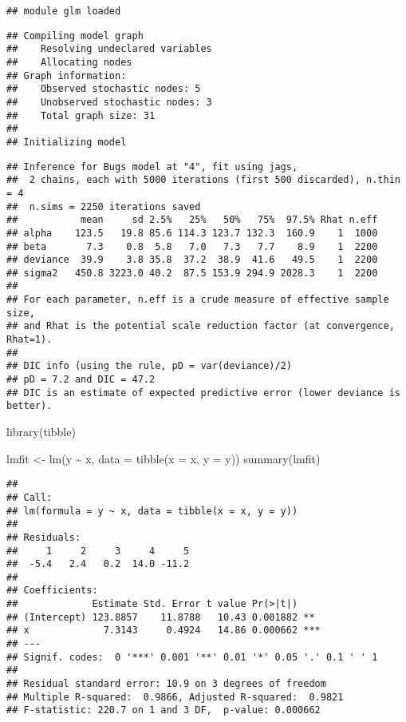 \documentclass[
  oneside]{book}
\newenvironment{Shaded}{\begin{snugshade}}{\end{snugshade}}
\newcommand{\AttributeTok}[1]{\textcolor[rgb]{0.77,0.63,0.00}{#1}}
\newcommand{\FunctionTok}[1]{\textcolor[rgb]{0.00,0.00,0.00}{#1}}
\newcommand{\NormalTok}[1]{#1}
\newcommand{\OtherTok}[1]{\textcolor[rgb]{0.56,0.35,0.01}{#1}}
\newcommand{\SpecialCharTok}[1]{\textcolor[rgb]{0.00,0.00,0.00}{#1}}
\begin{document}
\begin{verbatim}
## module glm loaded
\end{verbatim}

\begin{verbatim}
## Compiling model graph
##    Resolving undeclared variables
##    Allocating nodes
## Graph information:
##    Observed stochastic nodes: 5
##    Unobserved stochastic nodes: 3
##    Total graph size: 31
## 
## Initializing model
\end{verbatim}

\begin{Shaded}
\end{Shaded}

\begin{verbatim}
## Inference for Bugs model at "4", fit using jags,
##  2 chains, each with 5000 iterations (first 500 discarded), n.thin = 4
##  n.sims = 2250 iterations saved
##           mean     sd 2.5%   25%   50%   75%  97.5% Rhat n.eff
## alpha    123.5   19.8 85.6 114.3 123.7 132.3  160.9    1  1000
## beta       7.3    0.8  5.8   7.0   7.3   7.7    8.9    1  2200
## deviance  39.9    3.8 35.8  37.2  38.9  41.6   49.5    1  2200
## sigma2   450.8 3223.0 40.2  87.5 153.9 294.9 2028.3    1  2200
## 
## For each parameter, n.eff is a crude measure of effective sample size,
## and Rhat is the potential scale reduction factor (at convergence, Rhat=1).
## 
## DIC info (using the rule, pD = var(deviance)/2)
## pD = 7.2 and DIC = 47.2
## DIC is an estimate of expected predictive error (lower deviance is better).
\end{verbatim}

\begin{Shaded}
\begin{Highlighting}[]
\FunctionTok{library}\NormalTok{(tibble)}

\NormalTok{lmfit }\OtherTok{\textless{}{-}} \FunctionTok{lm}\NormalTok{(y }\SpecialCharTok{\textasciitilde{}}\NormalTok{ x, }\AttributeTok{data =} \FunctionTok{tibble}\NormalTok{(}\AttributeTok{x =}\NormalTok{ x, }\AttributeTok{y =}\NormalTok{ y))}
\FunctionTok{summary}\NormalTok{(lmfit)}
\end{Highlighting}
\end{Shaded}

\begin{verbatim}
## 
## Call:
## lm(formula = y ~ x, data = tibble(x = x, y = y))
## 
## Residuals:
##     1     2     3     4     5 
##  -5.4   2.4   0.2  14.0 -11.2 
## 
## Coefficients:
##             Estimate Std. Error t value Pr(>|t|)    
## (Intercept) 123.8857    11.8788   10.43 0.001882 ** 
## x             7.3143     0.4924   14.86 0.000662 ***
## ---
## Signif. codes:  0 '***' 0.001 '**' 0.01 '*' 0.05 '.' 0.1 ' ' 1
## 
## Residual standard error: 10.9 on 3 degrees of freedom
## Multiple R-squared:  0.9866, Adjusted R-squared:  0.9821 
## F-statistic: 220.7 on 1 and 3 DF,  p-value: 0.000662
\end{verbatim}
\end{document}
